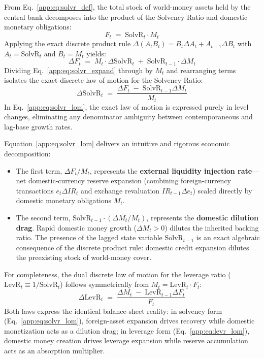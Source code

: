 From Eq.~\eqref{app:eq:solvr_def}, the total stock of world-money assets held by the central bank decomposes into the product of the Solvency Ratio and domestic monetary obligations:
\begin{equation}
	\label{app:eq:solvr_sub}
	F_t \;=\; \text{SolvR}_t \cdot M_t
\end{equation}
Applying the exact discrete product rule $\Delta(A_t B_t) = B_t \Delta A_t + A_{t-1} \Delta B_t$ with $A_t = \text{SolvR}_t$ and $B_t = M_t$ yields:
\begin{equation}
	\label{app:eq:solvr_expand}
	\Delta F_t \;=\; M_t \cdot \Delta\text{SolvR}_t \;+\; \text{SolvR}_{t-1} \cdot \Delta M_t
\end{equation}
Dividing Eq.~\eqref{app:eq:solvr_expand} through by $M_t$ and rearranging terms isolates the exact discrete law of motion for the Solvency Ratio:
\begin{equation}
	\label{app:eq:solvr_lom}
	\boxed{\;\Delta\text{SolvR}_t \;=\; \frac{\Delta F_t \;-\; \text{SolvR}_{t-1} \Delta M_t}{M_t}\;}
\end{equation}
In Eq.~\eqref{app:eq:solvr_lom}, the exact law of motion is expressed purely in level changes, eliminating any denominator ambiguity between contemporaneous and lag-base growth rates.

Equation~\eqref{app:eq:solvr_lom} delivers an intuitive and rigorous economic decomposition:
\begin{itemize}[leftmargin=2em]
	\item The first term, $\Delta F_t / M_t$, represents the \textbf{external liquidity injection rate}---net domestic-currency reserve expansion (combining foreign-currency transactions $e_t \Delta IR_t$ and exchange revaluation $IR_{t-1} \Delta e_t$) scaled directly by domestic monetary obligations $M_t$.
	\item The second term, $\text{SolvR}_{t-1} \cdot (\Delta M_t / M_t)$, represents the \textbf{domestic dilution drag}. Rapid domestic money growth ($\Delta M_t > 0$) dilutes the inherited backing ratio. The presence of the lagged state variable $\text{SolvR}_{t-1}$ is an exact algebraic consequence of the discrete product rule: domestic credit expansion dilutes the preexisting stock of world-money cover.
\end{itemize}

For completeness, the dual discrete law of motion for the leverage ratio ($\text{LevR}_t \equiv 1/\text{SolvR}_t$) follows symmetrically from $M_t = \text{LevR}_t \cdot F_t$:
\begin{equation}
	\label{app:eq:levr_lom}
	\Delta\text{LevR}_t \;=\; \frac{\Delta M_t \;-\; \text{LevR}_{t-1} \Delta F_t}{F_t}
\end{equation}
Both laws express the identical balance-sheet reality: in solvency form (Eq.~\ref{app:eq:solvr_lom}), foreign-asset expansion drives recovery while domestic monetization acts as a dilution drag; in leverage form (Eq.~\ref{app:eq:levr_lom}), domestic money creation drives leverage expansion while reserve accumulation acts as an absorption multiplier.

